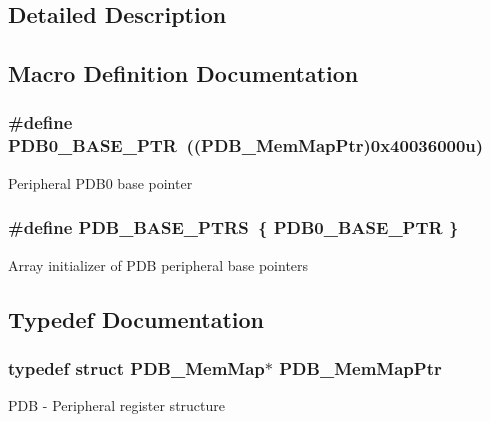 \subsection{Detailed Description}


\subsection{Macro Definition Documentation}
\hypertarget{group___p_d_b___peripheral_ga8e197b7c43fd7a0bf1a38caa1918b7b5}{}
\subsubsection[{P\+D\+B0\+\_\+\+B\+A\+S\+E\+\_\+\+P\+T\+R}]{\setlength{\rightskip}{0pt plus 5cm}\#define P\+D\+B0\+\_\+\+B\+A\+S\+E\+\_\+\+P\+T\+R~(({\bf P\+D\+B\+\_\+\+Mem\+Map\+Ptr})0x40036000u)}\label{group___p_d_b___peripheral_ga8e197b7c43fd7a0bf1a38caa1918b7b5}
Peripheral P\+D\+B0 base pointer \hypertarget{group___p_d_b___peripheral_ga6dce940c99da63282b1d28f65ed75293}{}
\subsubsection[{P\+D\+B\+\_\+\+B\+A\+S\+E\+\_\+\+P\+T\+R\+S}]{\setlength{\rightskip}{0pt plus 5cm}\#define P\+D\+B\+\_\+\+B\+A\+S\+E\+\_\+\+P\+T\+R\+S~\{ {\bf P\+D\+B0\+\_\+\+B\+A\+S\+E\+\_\+\+P\+T\+R} \}}\label{group___p_d_b___peripheral_ga6dce940c99da63282b1d28f65ed75293}
Array initializer of P\+D\+B peripheral base pointers 

\subsection{Typedef Documentation}
\hypertarget{group___p_d_b___peripheral_ga99a192ea14b33afb792a0de304e131be}{}
\subsubsection[{P\+D\+B\+\_\+\+Mem\+Map\+Ptr}]{\setlength{\rightskip}{0pt plus 5cm}typedef struct {\bf P\+D\+B\+\_\+\+Mem\+Map}$\ast$ {\bf P\+D\+B\+\_\+\+Mem\+Map\+Ptr}}\label{group___p_d_b___peripheral_ga99a192ea14b33afb792a0de304e131be}
P\+D\+B -\/ Peripheral register structure 